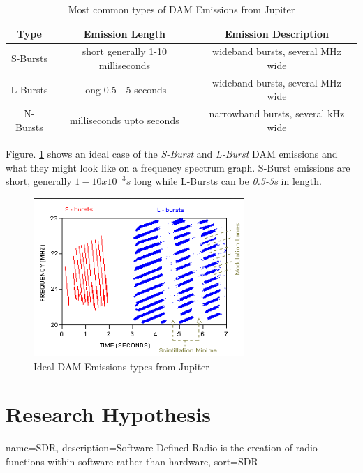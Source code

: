 \documentclass[runningheads,a4paper]{llncs}
\begin{document}
%
\begin{table}
  \centering
  \begin{tabular}[pos]{| c | c | c |}
    \hline
    Type & Emission Length & Emission Description\\ \hline
    S-Bursts & short generally 1-10 milliseconds & wideband bursts, several MHz wide\\ \hline
    L-Bursts & long 0.5 - 5 seconds & wideband bursts, several MHz wide\\ \hline
    N-Bursts & milliseconds upto seconds & narrowband bursts, several kHz wide\\
    \hline
  \end{tabular}
  \caption{Most common types of DAM Emissions from Jupiter \citep{wilkinson94}}
  \label{tab:dam_emissions}
\end{table}
%

Figure. \ref{fig:dam_emissions_spectrum} shows an ideal case of the \textit{S-Burst} and \textit{L-Burst} \gls{DAM} emissions and what they might look like on a frequency spectrum graph. S-Burst emissions are short, generally $1-10x10^{-3}s$ long while L-Bursts can be \textit{0.5-5s} in length.

%
\begin{figure}[here]
\centering
\includegraphics[width=8cm]{images/05}
\caption{Ideal DAM Emissions types from Jupiter \citep{wilkinson94}}
\label{fig:dam_emissions_spectrum}
\end{figure}
%

%
\newpage
\section*{Research Hypothesis}
%
{
  name={SDR},
  description={Software Defined Radio is the creation of radio functions within software rather than hardware},
  sort=SDR
}
\end{document}
